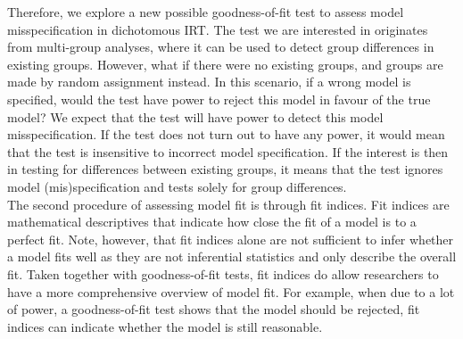 \documentclass[Royal,sageapa,times,doublespace]{sagej}
\begin{document}
\indent Therefore, we explore a new possible goodness-of-fit test to assess model misspecification in dichotomous IRT. The test we are interested in originates from multi-group analyses, where it can be used to detect group differences in existing groups. However, what if there were no existing groups, and groups are made by random assignment instead. In this scenario, if a wrong model is specified, would the test have power to reject this model in favour of the true model? We expect that the test will have power to detect this model misspecification. If the test does not turn out to have any power, it would mean that the test is insensitive to incorrect model specification. If the interest is then in testing for differences between existing groups, it means that the test ignores model (mis)specification and tests solely for group differences. \\
\indent The second procedure of assessing model fit is through fit indices. Fit indices are mathematical descriptives that indicate how close the fit of a model is to a perfect fit. Note, however, that fit indices alone are not sufficient to infer whether a model fits well as they are not inferential statistics and only describe the overall fit. Taken together with goodness-of-fit tests, fit indices do allow researchers to have a more comprehensive overview of model fit. For example, when due to a lot of power, a goodness-of-fit test shows that the model should be rejected, fit indices can indicate whether the model is still reasonable. \\ 
\end{document}
